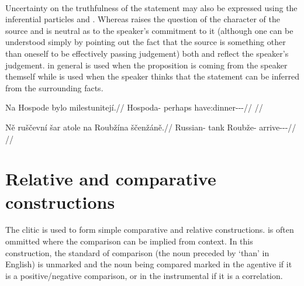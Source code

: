 \pex
{}\smallskip\\
{\footnotesize{}}
\xe

Uncertainty on the truthfulness of the statement may also be expressed using the
inferential particles  and . Whereas  raises the
question of the character of the source and is neutral as to the speaker’s
commitment to it (although one can be understood simply by pointing out the fact
that the source is something other than oneself to be effectively passing
judgement) both  and  reflect the speaker’s judgement.
 in general is used when the proposition is coming from the speaker
themself while  is used when the speaker thinks that the statement
can be inferred from the surrounding facts.

\pex
\begingl
  \gla Na Hospode bylo milestunitejí.//
  \glb \Loc{} Hospoda-\Acc{} perhaps have:dinner-\Lv{}-\SupP{}-\Quot{}//
  \glft {}//
\endgl
\xe

\pex
\begingl
  \gla Ně ruščevní šar atole na Roubžína ščenžáně.//
  \glb \Pl{} Russian-\Att{} tank \Infer{} \Loc{} Roubže-\Acc{} arrive-\Av{}-\Ret{}-\Quot{}//
  \glft {}//
\endgl
\xe

\section{Relative and comparative
constructions}\label{relativecomparative}

The clitic  is used to form simple comparative and
relative constructions.  is often ommitted where the comparison can be
implied from context. In this construction, the standard of
comparison (the noun preceded by `than' in
English) is unmarked and the noun being compared marked in the
agentive if it is a positive/negative comparison, or in the
instrumental if it is a correlation.

